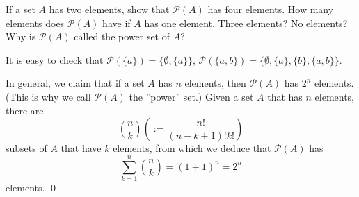 \documentclass[a4paper,12pt]{article}
\begin{document}
\begin{exe}
	If a set \( A \) has two elements, show that \( \mathcal{P}(A) \) has four elements.
	How many elements does \( \mathcal{P}(A) \) have if \( A \) has one element.
	Three elements?
	No elements?
	Why is \( \mathcal{P}(A) \) called the power set of \( A \)?
\end{exe}\begin{sol}
	It is easy to check that
	\( \mathcal{P}(\{ a \}) = \{ \emptyset, \{ a \} \} \),
	\( \mathcal{P}(\{ a,b \}) = \{ \emptyset, \{ a \},\{ b \},\{ a,b \} \} \).
	
	
	In general, we claim that
	if a set \( A \) has \( n \) elements,
	then \( \mathcal{P}(A) \) has \( 2^n \) elements.
	(This is why we call \( \mathcal{P}(A) \) the ''power'' set.)
	Given a set \( A \) that has \( n \) elements,
	there are
	\begin{equation*}
		\binom{n}{k}\left( :=\frac{n!}{(n-k+1)!k!} \right)
	\end{equation*}
	subsets of \( A \) that have \( k \) elements,
	from which we deduce that
	\( \mathcal{P}(A) \) has
	\begin{equation*}
		\sum_{k=1}^{n}\binom{n}{k}
		= (1+1)^n=2^n
	\end{equation*}
	elements.
	\qed\end{sol}
\end{document}
